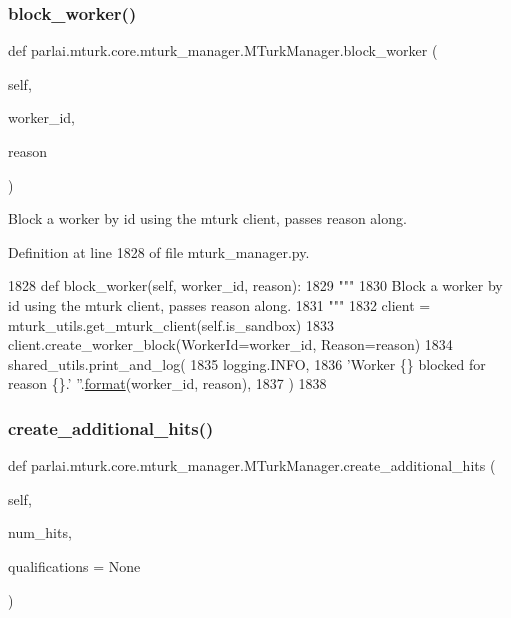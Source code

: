 \subsubsection{\texorpdfstring{block\+\_\+worker()}{block\_worker()}}
{\footnotesize\ttfamily def parlai.\+mturk.\+core.\+mturk\+\_\+manager.\+M\+Turk\+Manager.\+block\+\_\+worker (\begin{DoxyParamCaption}\item[{}]{self,  }\item[{}]{worker\+\_\+id,  }\item[{}]{reason }\end{DoxyParamCaption})}

\begin{DoxyVerb}Block a worker by id using the mturk client, passes reason along.
\end{DoxyVerb}
 

Definition at line 1828 of file mturk\+\_\+manager.\+py.


\begin{DoxyCode}
1828     \textcolor{keyword}{def }block\_worker(self, worker\_id, reason):
1829         \textcolor{stringliteral}{"""}
1830 \textcolor{stringliteral}{        Block a worker by id using the mturk client, passes reason along.}
1831 \textcolor{stringliteral}{        """}
1832         client = mturk\_utils.get\_mturk\_client(self.is\_sandbox)
1833         client.create\_worker\_block(WorkerId=worker\_id, Reason=reason)
1834         shared\_utils.print\_and\_log(
1835             logging.INFO,
1836             \textcolor{stringliteral}{'Worker \{\} blocked for reason \{\}.'} \textcolor{stringliteral}{''}.\hyperlink{namespaceparlai_1_1chat__service_1_1services_1_1messenger_1_1shared__utils_a32e2e2022b824fbaf80c747160b52a76}{format}(worker\_id, reason),
1837         )
1838 
\end{DoxyCode}
\mbox{\label{classparlai_1_1mturk_1_1core_1_1mturk__manager_1_1MTurkManager_ae192d527cf9dcf694d8111fb283aa5d7}} 
\subsubsection{\texorpdfstring{create\+\_\+additional\+\_\+hits()}{create\_additional\_hits()}}
{\footnotesize\ttfamily def parlai.\+mturk.\+core.\+mturk\+\_\+manager.\+M\+Turk\+Manager.\+create\+\_\+additional\+\_\+hits (\begin{DoxyParamCaption}\item[{}]{self,  }\item[{}]{num\+\_\+hits,  }\item[{}]{qualifications = {\ttfamily None} }\end{DoxyParamCaption})}

